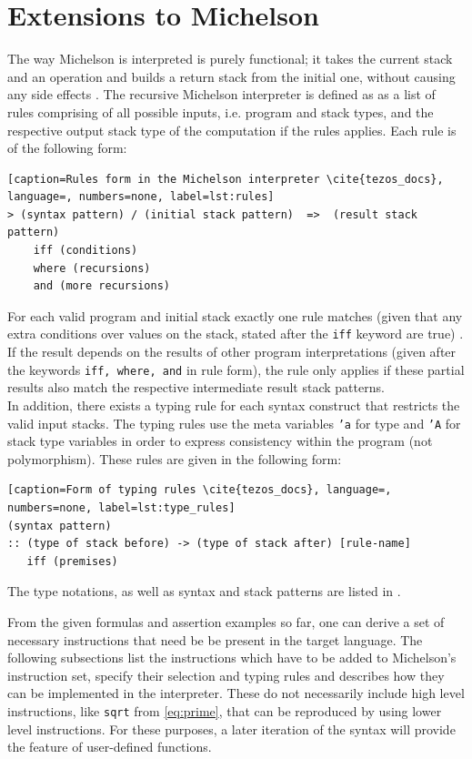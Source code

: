 \section{Extensions to Michelson}
The way Michelson is interpreted is purely functional; it takes the current stack and an operation and builds a return stack from the initial one, without causing any side effects \cite{tezos_docs}. The recursive Michelson interpreter is defined as as a list of rules comprising of all possible inputs, i.e. program and stack types, and the respective output stack type of the computation if the rules applies. Each rule is of the following form: 
\begin{lstlisting}[caption=Rules form in the Michelson interpreter \cite{tezos_docs}, language=, numbers=none, label=lst:rules]
> (syntax pattern) / (initial stack pattern)  =>  (result stack pattern)
    iff (conditions)
    where (recursions)
    and (more recursions)
\end{lstlisting}
For each valid program and initial stack exactly one rule matches (given that any extra conditions over values on the stack, stated after the \texttt{iff} keyword are true) \cite{tezos_docs}. If the result depends on the results of other program interpretations (given after the keywords \texttt{iff, where, and} in rule form), the rule only applies if these partial results also match the respective intermediate result stack patterns.\\
In addition, there exists a typing rule for each syntax construct that restricts the valid input stacks. The typing rules use the meta variables \texttt{'a} for type and \texttt{'A} for stack type variables in order to express consistency within the program (not polymorphism). These rules are given in the following form:
\begin{lstlisting}[caption=Form of typing rules \cite{tezos_docs}, language=, numbers=none, label=lst:type_rules]
(syntax pattern)
:: (type of stack before) -> (type of stack after) [rule-name]
   iff (premises)
\end{lstlisting}
The type notations, as well as syntax and stack patterns are listed in \cite{tezos_docs}.

From the given formulas and assertion examples so far, one can derive a set of necessary instructions that need be be present in the target language. The following subsections list the instructions which have to be added to Michelson's instruction set, specify their selection and typing rules and describes how they can be implemented in the interpreter. These do not necessarily include high level instructions, like \texttt{sqrt} from \eqref{eq:prime}, that can be reproduced by using lower level instructions. For these purposes, a later iteration of the syntax will provide the feature of user-defined functions.

